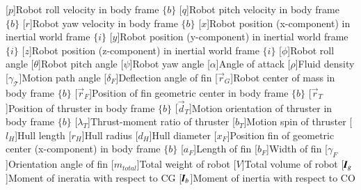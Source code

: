 \begin{acronym}
	[$p$]{Robot roll velocity in body frame $\lbrace b \rbrace$}
	[$q$]{Robot pitch velocity in body frame $\lbrace b \rbrace$}
	[$r$]{Robot yaw velocity in body frame $\lbrace b \rbrace$}
	[$x$]{Robot position (x-component) in inertial world frame $\lbrace i \rbrace$}
	[$y$]{Robot position (y-component) in inertial world frame $\lbrace i \rbrace$}
	[$z$]{Robot position (z-component) in inertial world frame $\lbrace i \rbrace$}
	[$\phi$]{Robot roll angle}
    [$\theta$]{Robot pitch angle}
    [$\psi$]{Robot yaw angle}
    [$\alpha$]{Angle of attack}
    [$\rho$]{Fluid density}
    [$\gamma_{\mathcal{T}}$]{Motion path angle}
    [$\delta_{F}$]{Deflection angle of fin}
    [$\vec{r}_{G}$]{Robot center of mass in body frame $\lbrace b \rbrace$}
    [$\vec{r}_{F}$]{Position of fin geometric center in body frame $\lbrace b \rbrace$}
    [$\vec{r}_{T}$]{Position of thruster in body frame $\lbrace b \rbrace$}
    [$\vec{d}_{T}$]{Motion orientation of thruster in body frame $\lbrace b \rbrace$}
    [$\lambda_{T}$]{Thrust-moment ratio of thruster}
    [$b_{T}$]{Motion spin of thruster}
    [$l_{H}$]{Hull length}
    [$r_{H}$]{Hull radius}
    [$d_{H}$]{Hull diameter}
    [$x_{F}$]{Position fin of geometric center (x-component) in body frame $\lbrace b \rbrace$ }
    [$a_{F}$]{Length of fin}
    [$b_{F}$]{Width of fin}
    [$\gamma_{F}$]{Orientation angle of fin}
    	[$m_{total}$]{Total weight of robot}
    	[$V$]{Total volume of robot}
    	[$\emph{\textbf{I}}_{g}$]{Moment of ineratia with respect to CG}
    	[$\emph{\textbf{I}}_{b}$]{Moment of inertia with respect to CO}
\end{acronym}